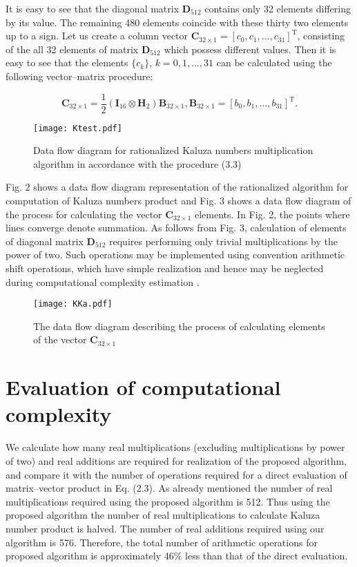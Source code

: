 \documentclass{jtacs}
\numberwithin{equation}{section}
\begin{document}
It is easy to see that the diagonal matrix $\mathbf{D}_{512}$ contains only 32 elements differing by its
value. The remaining 480 elements coincide with these thirty two elements up to a sign. Let us create a column vector $\mathbf{C}_{32\times1}=[ c_0,c_1,\dots,c_{31}]^{\mathrm{T}}$, consisting of the all 32 elements of matrix $\mathbf{D}_{512}$ which possess different values. Then it is easy to see that the elements $ \{ c_k \} $, $k=0,1,\dots,31$ can be calculated using the following vector–matrix procedure:

\[
\mathbf{C}_{32\times1}=\frac{1}{2}(\mathbf{I}_{16}\otimes\mathbf{H}_{2})\mathbf{B}_{32\times1},\mathbf{B}_{32\times1}=[b_0,b_1,\dots,b_{31}]^{\mathrm{T}}.
\]



\begin{figure}[b!]
 \centering
  \texttt{[image: Ktest.pdf]}
  \caption{Data flow diagram for rationalized Kaluza numbers multiplication algorithm in accordance
with the procedure (3.3)}
  \label{fig2}
\end{figure}
\FloatBarrier

Fig. 2 shows a data flow diagram representation of the rationalized algorithm for computation
of Kaluza numbers product and Fig. 3 shows a data flow diagram of the process
for calculating the vector $\mathbf{C}_{32\times1}$ elements. In Fig. 2, the points where lines converge denote
summation. As follows from Fig. 3, calculation of elements of diagonal matrix $\mathbf{D}_{512}$ requires
performing only trivial multiplications by the power of two. Such operations may be implemented using convention arithmetic shift operations, which have simple realization and hence may be neglected during computational complexity estimation \cite{24}.

\begin{figure}[hb]
 \centering
  \texttt{[image: KKa.pdf]}
  \caption{The data flow diagram describing the process of calculating elements of the vector $\mathbf{C}_{32\times1}$ }
  \label{fig3}
\end{figure}
\FloatBarrier

\section{Evaluation of computational complexity}

We calculate how many real multiplications (excluding multiplications by power of two)
and real additions are required for realization of the proposed algorithm, and compare it
with the number of operations required for a direct evaluation of matrix–vector product in
Eq. (2.3). As already mentioned the number of real multiplications required using the proposed
algorithm is 512. Thus using the proposed algorithm the number of real multiplications
to calculate Kaluza number product is halved. The number of real additions required
using our algorithm is 576. Therefore, the total number of arithmetic operations for proposed
algorithm is approximately 46\% less than that of the direct evaluation.
\end{document}
